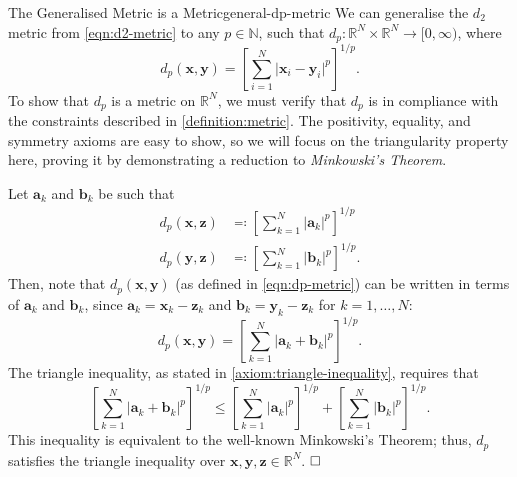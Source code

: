 \documentclass{article}
\renewcommand*\vec{\mathbf}
\renewcommand*\qedsymbol{\hfill\ensuremath{\Box}}
\numberwithin{equation}{section}
\begin{document}
\begin{theorem}{The Generalised Metric is a Metric}{general-dp-metric}
    We can generalise the $d_2$ metric from \cref{eqn:d2-metric} to any $ p
    \in \mathbb{N} $, such that $ d_p \colon \mathbb{R}^N \times \mathbb{R}^N
    \to [0, \infty) $, where
    \begin{equation}
        d_p(\vec{x}, \vec{y}) = \left[\sum_{i=1}^N \vert \vec{x}_i - \vec{y}_i
            \vert^p\right]^{1/p} \label{eqn:dp-metric}.
    \end{equation}
    To show that $ d_p $ is a metric on $ \mathbb{R}^N $, we must verify that $
    d_p $ is in compliance with the constraints described in
    \cref{definition:metric}. The positivity, equality, and symmetry axioms are
    easy to show, so we will focus on the triangularity property here, proving
    it by demonstrating a reduction to \emph{Minkowski's Theorem}.

    Let $ \vec{a}_k $ and $ \vec{b}_k $ be such that
    \begin{align}
        d_p(\vec{x}, \vec{z}) &\eqcolon \left[\sum_{k=1}^N \vert \vec{a}_k
            \vert^p\right]^{1/p} \\
        d_p(\vec{y}, \vec{z}) &\eqcolon \left[\sum_{k=1}^N \vert \vec{b}_k
            \vert^p\right]^{1/p}.
    \end{align}
    Then, note that $ d_p(\vec{x}, \vec{y}) $ (as defined in
    \cref{eqn:dp-metric}) can be
    written in terms of $ \vec{a}_k $ and $ \vec{b}_k $, since $ \vec{a}_k =
    \vec{x}_k - \vec{z}_k $ and $ \vec{b}_k = \vec{y}_k - \vec{z}_k $ for
    $ k = 1, \ldots, N $:
    \begin{equation}
        d_p(\vec{x}, \vec{y}) = \left[\sum_{k=1}^N \vert \vec{a}_k + \vec{b}_k
            \vert^p\right]^{1/p}.
    \end{equation}
    The triangle inequality, as stated in \cref{axiom:triangle-inequality},
    requires that
    \begin{equation}
        \left[\sum_{k=1}^N \vert \vec{a}_k + \vec{b}_k \vert^p\right]^{1/p} \leq
        \left[\sum_{k=1}^N \vert \vec{a}_k \vert^p\right]^{1/p} +
        \left[\sum_{k=1}^N \vert \vec{b}_k \vert^p\right]^{1/p}.
    \end{equation}
    This inequality is equivalent to the well-known Minkowski's Theorem; thus,
    $ d_p $ satisfies the triangle inequality over $ \vec{x}, \vec{y}, \vec{z}
    \in \mathbb{R}^N $. $ \qedsymbol $
\end{theorem}
\end{document}
